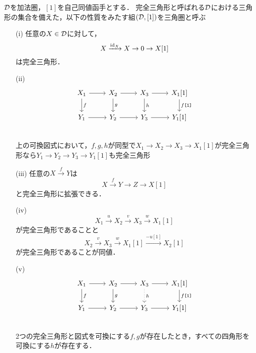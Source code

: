\begin{defn}\cite{KS06}
	${\mathcal D}$を加法圏，$[1]$を自己同値函手とする．
	完全三角形と呼ばれる${\mathcal D}$における三角形の集合を備えた，以下の性質をみたす組$({\mathcal D},[1])$を三角圏と呼ぶ$$$$
	\vspace{-3mm}
	\begin{itemize}
		\item[(i)]
			任意の$X\in{\mathcal D}$に対して，
			\[X\xrightarrow{\mathrm{id}_X}X\rightarrow 0 \rightarrow X[1]\]
			は完全三角形．
		\item[(ii)]
			\[
		\begin{tikzcd}
			X_1\ar[r]\ar[d,"f"]& X_2\ar[r]\ar[d,"g"]& X_3\ar[r]\ar[d,"h"] & X_1[1]\ar[d,"f\texttt{[1]}"]\\
			Y_1\ar[r]& Y_2\ar[r]& Y_3\ar[r] & Y_1[1]\\
		\end{tikzcd}
			\]
			上の可換図式において，$f,g,h$が同型で$X_1\rightarrow X_2\rightarrow X_3 \rightarrow X_1[1]$が完全三角形なら$Y_1\rightarrow Y_2\rightarrow Y_3 \rightarrow Y_1[1]$も完全三角形
		\item[(iii)]
			任意の$X\xrightarrow{f}Y$は
			\[X\xrightarrow{f} Y\rightarrow Z \rightarrow X[1]\]
		と完全三角形に拡張できる．
	\item[(iv)]
		\[
			X_1\xrightarrow{u} X_2\xrightarrow{v} X_3\xrightarrow{w}  X_1[1]
	\]
	が完全三角形であることと
	\[
		X_2\xrightarrow{v} X_3\xrightarrow{w} X_1[1]\xrightarrow{-u[1]}  X_2[1]
	\]
	が完全三角形であることが同値．
	\item[(v)]
		\[
		\begin{tikzcd}
			X_1\ar[r]\ar[d,"f"]& X_2\ar[r]\ar[d,"g"]& X_3\ar[r]\ar[d,"h",dotted] & X_1[1]\ar[d,"f\texttt{[1]}"]\\
			Y_1\ar[r]& Y_2\ar[r]& Y_3\ar[r] & Y_1[1]\\
		\end{tikzcd}
	\]
	2つの完全三角形と図式を可換にする$f,g$が存在したとき，すべての四角形を可換にする$h$が存在する．


\end{itemize}
\end{defn}
